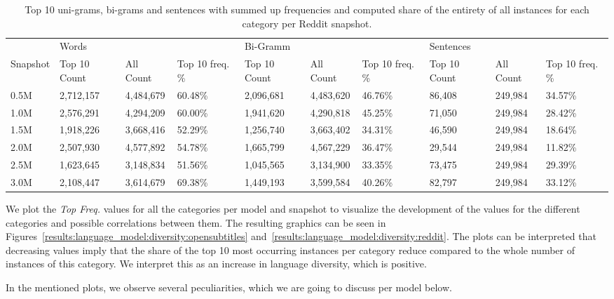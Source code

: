 \begin{table}[H]
	\centering
	\begin{adjustbox}{max width=\textwidth}
		\begin{tabular}{llllllllll}
			\toprule
			& Words &&&Bi-Gramm&&&Sentences&&\\
			Snapshot & Top 10 Count & All Count& Top 10 freq. \%&  Top 10 Count& All Count& Top 10 freq. \%&  Top 10 Count& All Count& Top 10 freq. \%\\
			\midrule
			0.5M & 2,712,157	 & 4,484,679	 & 60.48\%	&2,096,681	&4,483,620	&46.76\%	&86,408	&249,984	&34.57\%\\
			1.0M & 2,576,291	 & 4,294,209	 & 60.00\%	&1,941,620	&4,290,818	&45.25\%	&71,050	&249,984	&28.42\%\\
			1.5M & 1,918,226	 & 3,668,416	 & 52.29\%	&1,256,740	&3,663,402	&34.31\%	&46,590	&249,984	&18.64\%\\
			2.0M & 2,507,930	 & 4,577,892	 & 54.78\%	&1,665,799	&4,567,229	&36.47\%	&29,544	&249,984	&11.82\%\\
			2.5M & 1,623,645	 & 3,148,834	 & 51.56\%	&1,045,565	&3,134,900	&33.35\%	&73,475	&249,984	&29.39\%\\
			3.0M & 2,108,447	 & 3,614,679	 & 69.38\%	&1,449,193	&3,599,584	&40.26\%	&82,797	&249,984	&33.12\%\\
			\bottomrule
		\end{tabular}
	\end{adjustbox}
	\caption{Top 10 uni-grams, bi-grams and sentences with summed up frequencies and computed share of the entirety of all instances for each category per Reddit snapshot.}
	\label{results:top_10_frequency:reddit}
\end{table}

We plot the \emph{Top Freq.} values for all the categories per model and snapshot to visualize the development of the values for the different categories and possible correlations between them. The resulting graphics can be seen in Figures~\ref{results:language_model:diversity:opensubtitles} and~\ref{results:language_model:diversity:reddit}. The plots can be interpreted that decreasing values imply that the share of the top 10 most occurring instances per category reduce compared to the whole number of instances of this category. We interpret this as an increase in language diversity, which is positive.

In the mentioned plots, we observe several peculiarities, which we are going to discuss per model below.


